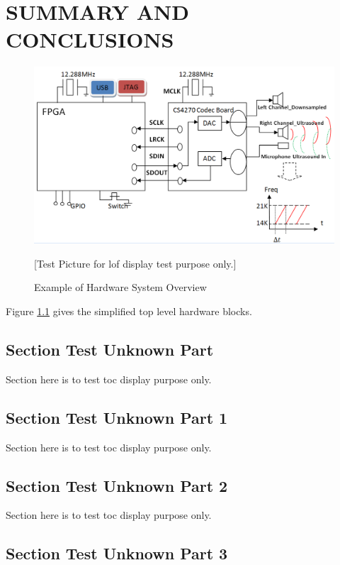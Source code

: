 \chapter{SUMMARY AND CONCLUSIONS \label{cha:AudioCircuit}}

\begin{figure}[!hbp]
\begin{center}
\includegraphics[width=\textwidth]{graphic/Top_Chirp_Design.PNG}
\caption{Example of Hardware System Overview}
\label{fig:OverAllDesign}
[Test Picture for lof display test purpose only.]
\end{center}
\end{figure}
Figure \ref{fig:OverAllDesign} gives the simplified top level hardware blocks.

 

\section{Section Test Unknown Part}
Section here is to test toc display purpose only.

\section{Section Test Unknown Part 1}

Section here is to test toc display purpose only.

\section{Section Test Unknown Part 2}

Section here is to test toc display purpose only.

\section{Section Test Unknown Part 3} 

